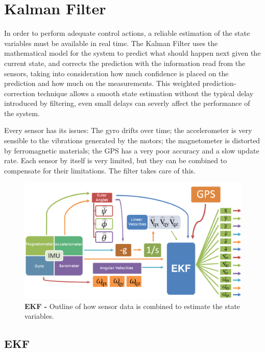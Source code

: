 \documentclass[conference]{IEEEtran}
\begin{document}
\section{Kalman Filter}

In order to perform adequate control actions, a reliable estimation of the state variables must be available in real time. The Kalman Filter uses the mathematical model for the system to predict what should happen next given the current state, and corrects the prediction with the information read from the sensors, taking into consideration how much confidence is placed on the prediction and how much on the measurements. This weighted prediction-correction technique allows a smooth state estimation without the typical delay introduced by filtering, even small delays can severly affect the performance of the system.

Every sensor has its issues: The gyro drifts over time; the accelerometer is very sensible to the vibrations generated by the motors; the magnetometer is distorted by ferromagnetic materials; the GPS has a very poor accuracy and a slow update rate. Each sensor by itself is very limited, but they can be combined to compensate for their limitations. The filter takes care of this.

\begin{figure}
	\centering
	\includegraphics[width=1\columnwidth]{./pics_paper/diagrama_kalman_eng.png}
	\caption{\textbf{EKF - } Outline of how sensor data is combined to estimate the state variables.}
	\label{fig:diagrama_kalman}
\end{figure}

\subsection{EKF}
\label{sec:kalman-ekf}
\end{document}
